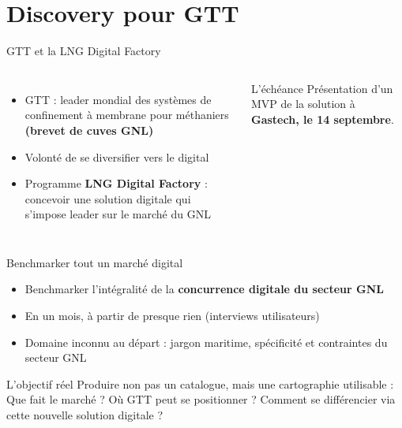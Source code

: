 \section{Discovery pour GTT}

\begin{frame}{GTT et la LNG Digital Factory}
  \begin{columns}[T]
    \begin{itemize}\footnotesize
      \item GTT : leader mondial des systèmes de confinement à membrane pour méthaniers \textbf{(brevet de cuves GNL)}
      \item Volonté de se diversifier vers le digital
      \item Programme \textbf{LNG Digital Factory} : concevoir une solution digitale qui s'impose leader sur le marché du GNL
    \end{itemize}
    \begin{alertblock}{L'échéance}
      \footnotesize Présentation d'un MVP de la solution à \textbf{Gastech, le 14 septembre}.
    \end{alertblock}
  \end{columns}
\end{frame}

\begin{frame}{Benchmarker tout un marché digital}
  \begin{itemize}\footnotesize
    \item Benchmarker l'intégralité de la \textbf{concurrence digitale du secteur GNL}
    \item En un mois, à partir de presque rien (interviews utilisateurs)
    \item Domaine inconnu au départ : jargon maritime, spécificité et contraintes du secteur GNL
  \end{itemize}
  \vskip 6pt
  \begin{block}{L'objectif réel}
    \footnotesize Produire non pas un catalogue, mais une cartographie utilisable : Que fait le marché ? Où GTT peut se positionner ? Comment se différencier via cette nouvelle solution digitale ?
  \end{block}
\end{frame}

